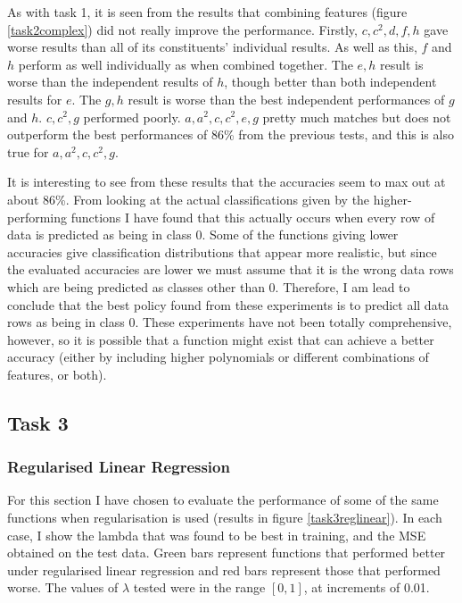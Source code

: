 \documentclass[a4paper,11pt]{article}
\begin{document}
As with task 1, it is seen from the results that combining features (figure \ref{task2complex}) did not really improve the performance.  Firstly, $c,c^2,d,f,h$ gave worse results than all of its constituents' individual results.  As well as this, $f$ and $h$ perform as well individually as when combined together.  The $e,h$ result is worse than the independent results of $h$, though better than both independent results for $e$.  The $g,h$ result is worse than the best independent performances of $g$ and $h$.  $c,c^2,g$ performed poorly.  $a,a^2,c,c^2,e,g$ pretty much matches but does not outperform the best performances of 86\%{} from the previous tests, and this is also true for $a,a^2,c,c^2,g$.

It is interesting to see from these results that the accuracies seem to max out at about 86\%.  From looking at the actual classifications given by the higher-performing functions I have found that this actually occurs when every row of data is predicted as being in class 0.  Some of the functions giving lower accuracies give classification distributions that appear more realistic, but since the evaluated accuracies are lower we must assume that it is the wrong data rows which are being predicted as classes other than 0.  Therefore, I am lead to conclude that the best policy found from these experiments is to predict all data rows as being in class 0.  These experiments have not been totally comprehensive, however, so it is possible that a function might exist that can achieve a better accuracy (either by including higher polynomials or different combinations of features, or both).

\subsection{Task 3}

\subsubsection{Regularised Linear Regression}

For this section I have chosen to evaluate the performance of some of the same functions when regularisation is used (results in figure \ref{task3reglinear}).  In each case, I show the lambda that was found to be best in training, and the MSE obtained on the test data.  Green bars represent functions that performed better under regularised linear regression and red bars represent those that performed worse.  The values of $\lambda$ tested were in the range $[0,1]$, at increments of 0.01.
\end{document}
